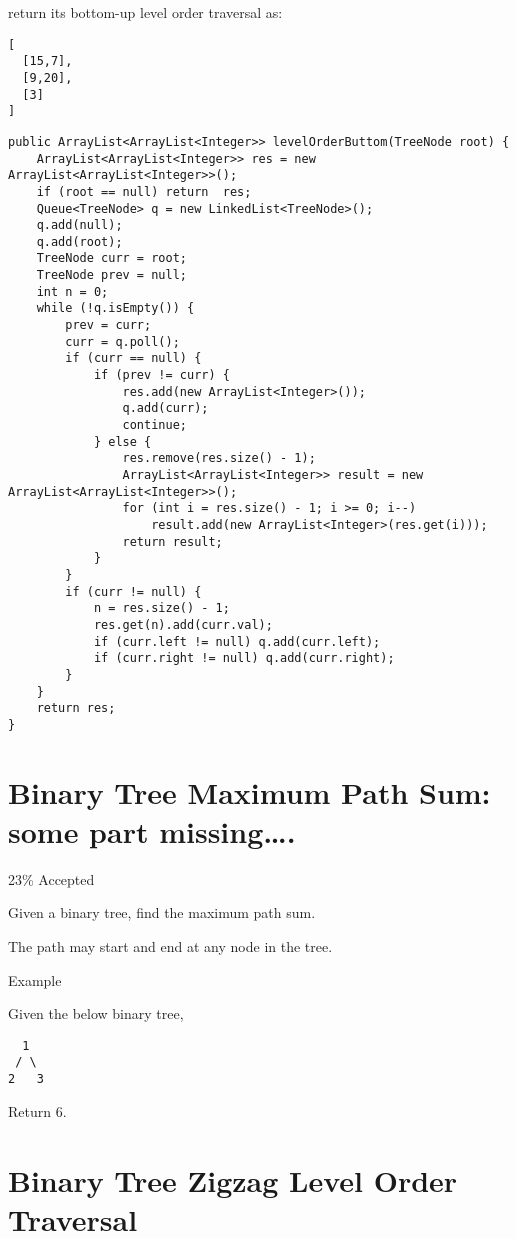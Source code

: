 \documentclass[12pt]{book}
\begin{document}
return its bottom-up level order traversal as:
\lstset{language=java,label= ,caption= ,numbers=none}
\begin{lstlisting}
[
  [15,7],
  [9,20],
  [3]
]
\end{lstlisting}
\lstset{language=java,label= ,caption= ,numbers=none}
\begin{lstlisting}
public ArrayList<ArrayList<Integer>> levelOrderButtom(TreeNode root) {
    ArrayList<ArrayList<Integer>> res = new ArrayList<ArrayList<Integer>>();
    if (root == null) return  res;
    Queue<TreeNode> q = new LinkedList<TreeNode>();
    q.add(null);
    q.add(root);
    TreeNode curr = root;
    TreeNode prev = null;
    int n = 0;
    while (!q.isEmpty()) {
        prev = curr;
        curr = q.poll();
        if (curr == null) {
            if (prev != curr) {
                res.add(new ArrayList<Integer>());
                q.add(curr);
                continue;
            } else {
                res.remove(res.size() - 1);
                ArrayList<ArrayList<Integer>> result = new ArrayList<ArrayList<Integer>>();
                for (int i = res.size() - 1; i >= 0; i--) 
                    result.add(new ArrayList<Integer>(res.get(i)));
                return result;   
            }
        }
        if (curr != null) {
            n = res.size() - 1;
            res.get(n).add(curr.val);
            if (curr.left != null) q.add(curr.left);
            if (curr.right != null) q.add(curr.right);
        }
    }
    return res;
}
\end{lstlisting}
\chapter{Binary Tree Maximum Path Sum: some part missing\ldots{}.}
\label{sec-17}

23\% Accepted

Given a binary tree, find the maximum path sum.

The path may start and end at any node in the tree.

Example

Given the below binary tree,
\lstset{language=java,label= ,caption= ,numbers=none}
\begin{lstlisting}
  1
 / \
2   3
\end{lstlisting}

Return 6.
\chapter{Binary Tree Zigzag Level Order Traversal}
\label{sec-18}
\end{document}
